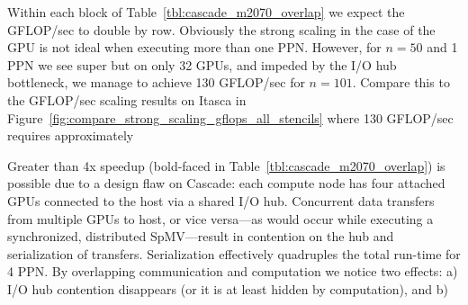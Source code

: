 Within each block of Table~\ref{tbl:cascade_m2070_overlap} we expect the GFLOP/sec to double by row. Obviously the strong scaling in the case of the GPU is not ideal when executing more than one PPN. However, for $n=50$ and 1 PPN we see super but on only 32 GPUs, and impeded by the I/O hub bottleneck, we manage to achieve 130 GFLOP/sec for $n=101$. Compare this to the GFLOP/sec scaling results on Itasca in Figure~\ref{fig:compare_strong_scaling_gflops_all_stencils} where 130 GFLOP/sec requires approximately 


Greater than 4x speedup (bold-faced in Table~\ref{tbl:cascade_m2070_overlap}) is possible due to a design flaw on Cascade: each compute node has four attached GPUs connected to the host via a shared I/O hub. Concurrent data transfers from multiple GPUs to host, or vice versa---as would occur while executing a synchronized, distributed SpMV---result in contention on the hub and serialization of transfers. Serialization effectively quadruples the total run-time for 4 PPN. By overlapping communication and computation we notice two effects: a) I/O hub contention disappears (or it is at least hidden by computation), and b) 


